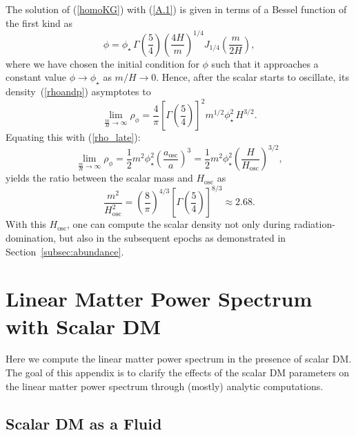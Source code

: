 \documentclass[11pt,nofootinbib]{article}
\numberwithin{equation}{section}
\begin{document}
The solution of (\ref{homoKG}) with (\ref{A.1}) is given in terms of 
a Bessel function of the first kind as
\begin{equation}
 \phi = \phi_{\star} \, \Gamma \left( \frac{5}{4}\right)
  \left( \frac{4 H}{m} \right)^{1/4}
  J_{1/4} \left(\frac{m}{2 H}\right),
\end{equation}
where we have chosen the initial condition for $\phi$ such that
it approaches a constant value
$\phi \to \phi_{\star}$ as $m / H \to 0$.
Hence, after the scalar starts to oscillate, 
its density~(\ref{rhoandp}) asymptotes to
\begin{equation}
 \lim_{ \frac{m}{H} \to \infty } \rho_\phi =
  \frac{4}{\pi }
  \left[ \Gamma \left(\frac{5}{4}\right) \right]^2
  m^{1/2} \phi_{\star}^2 \, H^{3/2}  .
\end{equation}
Equating this with (\ref{rho_late}):
\begin{equation}
 \lim_{ \frac{m}{H} \to \infty } \rho_\phi = 
  \frac{1}{2} m^2 \phi_{\star}^2
  \left(\frac{a_{\mathrm{osc}}}{a}\right)^3
  =   \frac{1}{2} m^2 \phi_{\star}^2
  \left(\frac{H}{H_{\mathrm{osc}}}\right)^{3/2} ,
\end{equation}
yields the ratio between the scalar mass and
$H_{\mathrm{osc}}$ as
\begin{equation}
 \frac{m^2}{H_{\mathrm{osc}}^2} = 
  \left( \frac{8}{\pi }  \right)^{4/3}
  \left[\Gamma \left(\frac{5}{4} \right) \right]^{8/3}
  \approx 2.68.
\end{equation}
With this $H_{\mathrm{osc}}$,
one can compute the scalar density not only during radiation-domination, but
also in the subsequent epochs
as demonstrated in Section~\ref{subsec:abundance}.




\section{Linear Matter Power Spectrum with Scalar DM}
\label{app:lmps}


Here we compute the linear matter power spectrum in the presence of scalar DM.
The goal of this appendix is to clarify the effects of the scalar DM
parameters on the linear matter power spectrum through 
(mostly) analytic computations. 

\subsection{Scalar DM as a Fluid}
\label{subsec:fluid}
\end{document}
